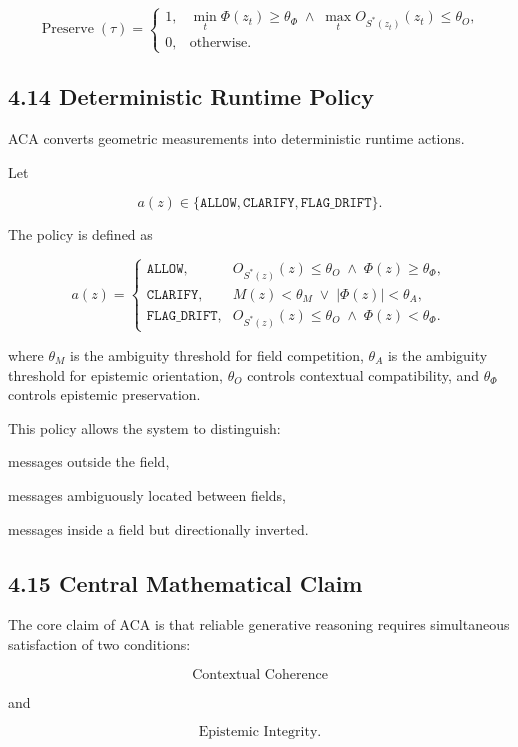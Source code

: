 \documentclass[11pt]{article}
\begin{document}
$$
\operatorname{Preserve}(\tau)
=
\begin{cases}
1, &
\min_{t}\Phi(z_t)\geq\theta_\Phi
\;\wedge\;
\max_{t}O_{S^{*}(z_t)}(z_t)\leq\theta_O,\\[4pt]
0, & \text{otherwise.}
\end{cases}
$$

\subsection{4.14 Deterministic Runtime Policy}

ACA converts geometric measurements into deterministic runtime actions.

Let

$$
a(z)\in
\{
\texttt{ALLOW},
\texttt{CLARIFY},
\texttt{FLAG\_DRIFT}
\}.
$$

The policy is defined as

$$
a(z)=
\begin{cases}
\texttt{ALLOW}, &
O_{S^{*}(z)}(z)\leq\theta_O
\;\wedge\;
\Phi(z)\geq\theta_\Phi,\\[4pt]
\texttt{CLARIFY}, &
M(z)<\theta_M
\;\vee\;
|\Phi(z)|<\theta_A,\\[4pt]
\texttt{FLAG\_DRIFT}, &
O_{S^{*}(z)}(z)\leq\theta_O
\;\wedge\;
\Phi(z)<\theta_\Phi.
\end{cases}
$$

where $\theta_M$ is the ambiguity threshold for field competition, $\theta_A$ is the ambiguity threshold for epistemic orientation, $\theta_O$ controls contextual compatibility, and $\theta_\Phi$ controls epistemic preservation.

This policy allows the system to distinguish:

messages outside the field,

messages ambiguously located between fields,

messages inside a field but directionally inverted.

\subsection{4.15 Central Mathematical Claim}

The core claim of ACA is that reliable generative reasoning requires simultaneous satisfaction of two conditions:

$$
\text{Contextual Coherence}
$$

and

$$
\text{Epistemic Integrity}.
$$
\end{document}
